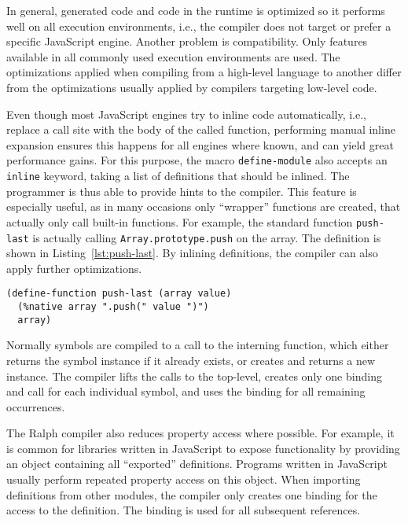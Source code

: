 \documentclass{acm_proc_article-sp}
\begin{document}
In general, generated code and code in the runtime is optimized so it
performs well on all execution environments, i.e., the compiler does
not target or prefer a specific JavaScript engine. Another problem is
compatibility. Only features available in all commonly used
execution environments are used. The optimizations applied when
compiling from a high-level language to another differ from the
optimizations usually applied by compilers targeting low-level code.

Even though most JavaScript engines try to inline code automatically,
i.e., replace a call site with the body of the called function,
performing manual inline expansion ensures this happens for all
engines where known, and can yield great performance gains. For this
purpose, the macro \texttt{define-module} also accepts an
\texttt{inline} keyword, taking a list of definitions that should be
inlined. The programmer is thus able to provide hints to the
compiler. This feature is especially useful, as in many occasions only
``wrapper'' functions are created, that actually only call built-in
functions. For example, the standard function \texttt{push-last} is
actually calling \texttt{Array.prototype.push} on the array. The
definition is shown in Listing~\ref{lst:push-last}. By inlining
definitions, the compiler can also apply further optimizations.

\begin{lstlisting}[label=lst:push-last,caption=Definition of standard
    function \texttt{push-last}]
(define-function push-last (array value)
  (%native array ".push(" value ")")
  array)
\end{lstlisting}

Normally symbols are compiled to a call to the interning function,
which either returns the symbol instance if it already exists, or
creates and returns a new instance. The compiler lifts the calls to
the top-level, creates only one binding and call for each individual
symbol, and uses the binding for all remaining occurrences.

The Ralph compiler also reduces property access where possible. For
example, it is common for libraries written in JavaScript to expose
functionality by providing an object containing all ``exported''
definitions. Programs written in JavaScript usually perform
repeated property access on this object. When importing definitions
from other modules, the compiler only creates one binding for the
access to the definition. The binding is used for all subsequent
references.
\end{document}

